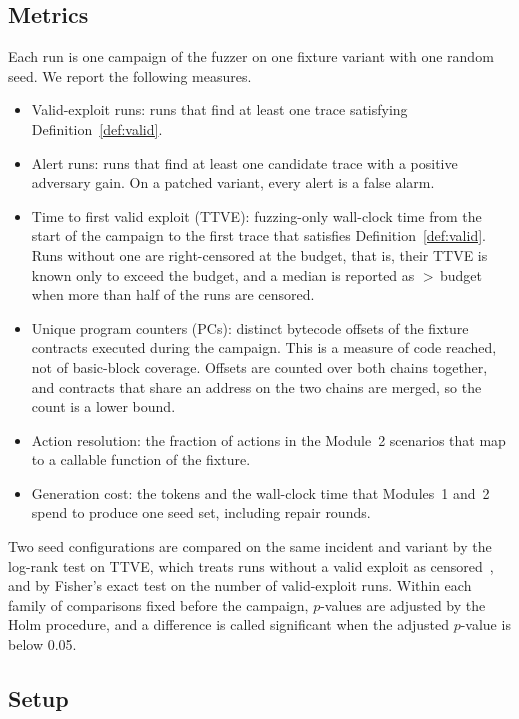 \documentclass[a4paper]{cas-sc}
\begin{document}
\subsection{Metrics}

Each run is one campaign of the fuzzer on one fixture variant with one random seed. We report the following measures.
\begin{itemize}
    \item Valid-exploit runs: runs that find at least one trace satisfying Definition~\ref{def:valid}.
    \item Alert runs: runs that find at least one candidate trace with a positive adversary gain. On a patched variant, every alert is a false alarm.
    \item Time to first valid exploit (TTVE): fuzzing-only wall-clock time from the start of the campaign to the first trace that satisfies Definition~\ref{def:valid}. Runs without one are right-censored at the budget, that is, their TTVE is known only to exceed the budget, and a median is reported as $>$\,budget when more than half of the runs are censored.
    \item Unique program counters (PCs): distinct bytecode offsets of the fixture contracts executed during the campaign. This is a measure of code reached, not of basic-block coverage. Offsets are counted over both chains together, and contracts that share an address on the two chains are merged, so the count is a lower bound.
    \item Action resolution: the fraction of actions in the Module~2 scenarios that map to a callable function of the fixture.
    \item Generation cost: the tokens and the wall-clock time that Modules~1 and~2 spend to produce one seed set, including repair rounds.
\end{itemize}
Two seed configurations are compared on the same incident and variant by the log-rank test on TTVE, which treats runs without a valid exploit as censored~\citep{klees2018evaluating}, and by Fisher's exact test on the number of valid-exploit runs. Within each family of comparisons fixed before the campaign, $p$-values are adjusted by the Holm procedure, and a difference is called significant when the adjusted $p$-value is below 0.05.

\subsection{Setup}
\end{document}
